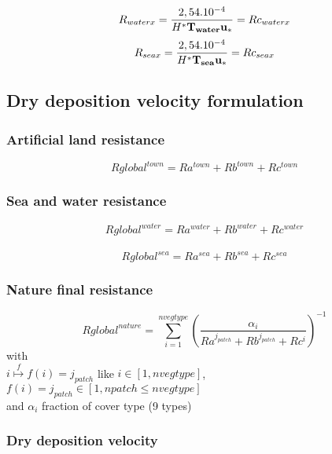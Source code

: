 \[R_{waterx} = \frac{2,54 . 10^{-4}}{H^* \bf{T_{water}} u_*}  = Rc_{waterx}\] 
\[R_{seax} = \frac{2,54 . 10^{-4}}{H^* \bf{T_{sea}} u_*}  = Rc_{seax}\]
 
\subsection{Dry deposition velocity formulation}

\subsubsection*{Artificial land resistance}
$$ Rglobal^{town} = Ra^{town} + Rb^{town} + Rc^{town} $$
\subsubsection*{Sea and water resistance}
$$Rglobal^{water} = Ra^{water} + Rb^{water} + Rc^{water}$$\\
$$Rglobal^{sea} = Ra^{sea} + Rb^{sea} + Rc^{sea}$$
\subsubsection*{Nature final resistance}
$$ Rglobal^{nature} = \sum_{i=1}^{nvegtype} {\left(
\frac{\alpha_i}{Ra^{j_{patch}} + Rb^{j_{patch}} + Rc^{i} }\right)^{-1}} $$
with\\
$i \stackrel{f}{\longmapsto} f(i) = j_{patch}$ like
 $i \in [1,nvegtype]$, $f(i)=j_{patch} \in [1,npatch\leq nvegtype]$ \\
and 
 $ \alpha_i $ fraction of cover type (9 types)

\subsubsection*{Dry deposition velocity}

